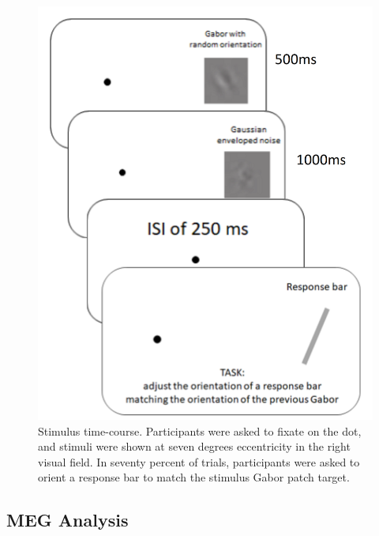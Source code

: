 \documentclass[../main.tex]{subfiles}
\begin{document}
\begin{figure}
    \centering
    \includegraphics[scale=0.22]{figures/methods/Experimental Task.png}
    \caption{Stimulus time-course. Participants were asked to fixate on the dot, and stimuli were shown at seven degrees eccentricity in the right visual field. In seventy percent of trials, participants were asked to orient a response bar to match the stimulus Gabor patch target.}
    \label{stim_course}
\end{figure}

\subsection*{MEG Analysis}
\end{document}
